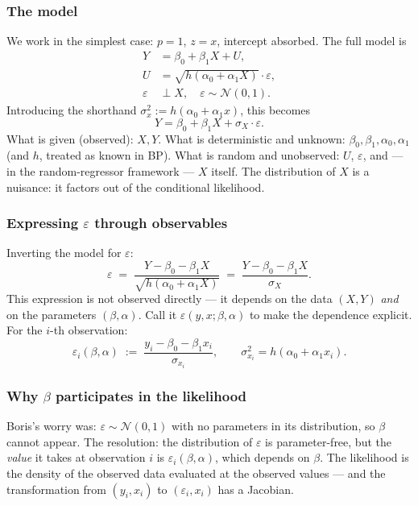\documentclass[a4paper,oneside,12pt]{extarticle}
\theoremstyle{plain}
\theoremstyle{definition}
\theoremstyle{remark}
\begin{document}
\subsubsection*{The model}

We work in the simplest case: $p = 1$, $z = x$, intercept absorbed.
The full model is
\begin{align*}
  Y &= \beta_0 + \beta_1 X + U, \\
  U &= \sqrt{h(\alpha_0 + \alpha_1 X)}\cdot\varepsilon, \\
  \varepsilon &\perp X, \quad \varepsilon \sim \mathcal{N}(0,1).
\end{align*}
Introducing the shorthand $\sigma_x^2 := h(\alpha_0 + \alpha_1 x)$,
this becomes
\[
  Y = \beta_0 + \beta_1 X + \sigma_X \cdot \varepsilon.
\]
What is given (observed): $X, Y$.  What is deterministic and unknown:
$\beta_0,\beta_1,\alpha_0,\alpha_1$ (and $h$, treated as known in BP).
What is random and unobserved: $U$, $\varepsilon$, and — in the
random-regressor framework — $X$ itself.  The distribution of $X$
is a nuisance: it factors out of the conditional likelihood.

\subsubsection*{Expressing $\varepsilon$ through observables}

Inverting the model for $\varepsilon$:
\[
  \varepsilon
  \;=\; \frac{Y - \beta_0 - \beta_1 X}{\sqrt{h(\alpha_0 + \alpha_1 X)}}
  \;=\; \frac{Y - \beta_0 - \beta_1 X}{\sigma_X}.
\]
This expression is not observed directly — it depends on the data
$(X, Y)$ \emph{and} on the parameters $(\beta, \alpha)$.  Call it
$\varepsilon(y, x;\beta,\alpha)$ to make the dependence explicit.
For the $i$-th observation:
\[
  \varepsilon_i(\beta,\alpha)
  \;:=\;
  \frac{y_i - \beta_0 - \beta_1 x_i}{\sigma_{x_i}},
  \qquad
  \sigma_{x_i}^2 = h(\alpha_0 + \alpha_1 x_i).
\]

\subsubsection*{Why $\beta$ participates in the likelihood}

Boris's worry was: $\varepsilon \sim \mathcal{N}(0,1)$ with no
parameters in its distribution, so $\beta$ cannot appear.  The
resolution: the distribution of $\varepsilon$ is parameter-free, but
the \emph{value} it takes at observation $i$ is $\varepsilon_i(\beta,
\alpha)$, which depends on $\beta$.  The likelihood is the density of
the observed data evaluated at the observed values — and the
transformation from $(y_i, x_i)$ to $(\varepsilon_i, x_i)$ has a
Jacobian.
\end{document}
